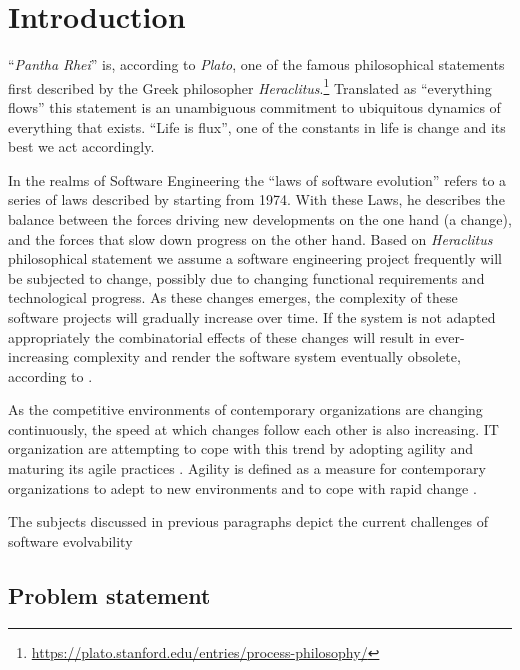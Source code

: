 \chapter{Introduction} \label{introduction}

\enquote{\emph{Pantha Rhei}} is, according to \emph{Plato}, one of the famous
philosophical statements first described by the Greek philosopher
\emph{Heraclitus}.\footnote[1]{\url{https://plato.stanford.edu/entries/process-philosophy/}}
Translated as \enquote{everything flows} this statement is an unambiguous commitment to
ubiquitous dynamics of everything that exists. \enquote{Life is flux}, one of the
constants in life is change and its best we act accordingly.

In the realms of Software Engineering the \enquote{laws of software evolution}
\parencite[]{lehman_programs_1980} refers to a series of laws described by
\citeauthor{lehman_programs_1980} starting from 1974. With these Laws, he describes the
balance between the forces driving new developments on the one hand (a change), and the
forces that slow down progress on the other hand. Based on \emph{Heraclitus} philosophical
statement we assume a software engineering project frequently will be subjected to change,
possibly due to changing functional requirements and technological progress. As these
changes emerges, the complexity of these software projects will gradually increase over
time. If the system is not adapted appropriately the combinatorial effects of these
changes will result in ever-increasing complexity and render the software system
eventually obsolete, according to \citeauthor{lehman_programs_1980}
\parencite[]{lehman_programs_1980}.

As the competitive environments of contemporary organizations are changing continuously,
the speed at which changes follow each other is also increasing. IT organization are
attempting to cope with this trend by adopting agility and maturing its agile practices
\parencite[]{2024_SIM_key_issues_and_trends}. Agility is defined as a measure for
contemporary organizations to adept to new environments and to cope with rapid change
\parencite[]{neumann_strategic_1994}.

The subjects discussed in previous paragraphs depict the current challenges of software
evolvability

\section{Problem statement} \label{problem_statement}

